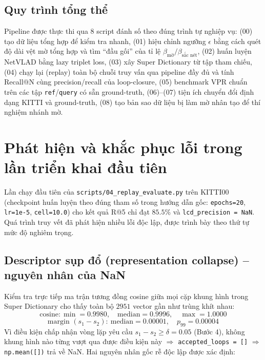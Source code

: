 \documentclass[a4paper,12pt]{article}
\begin{document}
\subsection{Quy trình tổng thể}
Pipeline được thực thi qua 8 script đánh số theo đúng trình tự nghiệp vụ: (00) tạo dữ liệu tổng hợp để kiểm tra nhanh, (01) hiệu chỉnh ngưỡng $\epsilon$ bằng cách quét độ dài vệt mờ tổng hợp và tìm ``đầu gối'' của tỉ lệ $\beta_{\text{mờ}}/\beta_{\text{sắc nét}}$, (02) huấn luyện NetVLAD bằng lazy triplet loss, (03) xây Super Dictionary từ tập tham chiếu, (04) chạy lại (replay) toàn bộ chuỗi truy vấn qua pipeline đầy đủ và tính Recall@N cùng precision/recall của loop-closure, (05) benchmark VPR chuẩn trên các tập \texttt{ref}/\texttt{query} có sẵn ground-truth, (06)--(07) tiện ích chuyển đổi định dạng KITTI và ground-truth, (08) tạo bản sao dữ liệu bị làm mờ nhân tạo để thí nghiệm nhánh mờ.

\section{Phát hiện và khắc phục lỗi trong lần triển khai đầu tiên}
Lần chạy đầu tiên của \texttt{scripts/04\_replay\_evaluate.py} trên KITTI00 (checkpoint huấn luyện theo đúng tham số trong hướng dẫn gốc: \texttt{epochs=20}, \texttt{lr=1e-5}, \texttt{cell=10.0}) cho kết quả R@5 chỉ đạt $85.5\%$ và \texttt{lcd\_precision = NaN}. Quá trình truy vết đã phát hiện nhiều lỗi độc lập, được trình bày theo thứ tự mức độ nghiêm trọng.

\subsection{Descriptor sụp đổ (representation collapse) -- nguyên nhân của NaN}
Kiểm tra trực tiếp ma trận tương đồng cosine giữa mọi cặp khung hình trong Super Dictionary cho thấy toàn bộ $2951$ vector gần như trùng khít nhau:
$$\text{cosine}: \min = 0.9980,\quad \text{median} = 0.9996,\quad \max = 1.0000$$
$$\text{margin } (s_1 - s_2):\ \text{median} = 0.00001,\quad p_{99} = 0.00004$$
Vì điều kiện chấp nhận vòng lặp yêu cầu $s_1 - s_2 \ge \delta = 0.05$ (Bước 4), không khung hình nào từng vượt qua được điều kiện này $\Rightarrow$ \texttt{accepted\_loops = []} $\Rightarrow$ \texttt{np.mean([])} trả về NaN. Hai nguyên nhân gốc rễ độc lập được xác định:
\end{document}

